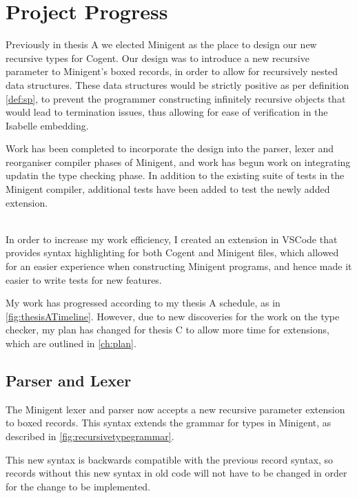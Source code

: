 \chapter{Project Progress}\label{ch:progress}

Previously in thesis A we elected Minigent as the place to design our new recursive types for Cogent.
Our design was to introduce a new recursive parameter to Minigent's boxed records, in order to allow
for recursively nested data structures. These data structures would be strictly positive as per
definition \autoref{def:sp}, to prevent the programmer constructing infinitely recursive
objects that would lead to termination issues, thus allowing for ease of verification in
the Isabelle embedding.

Work has been completed to incorporate the design into the parser, lexer and reorganiser compiler phases of
Minigent, and work has begun work on integrating updatin the type checking phase.
In addition to the existing suite of tests in the Minigent compiler, additional tests have 
been added to test the newly added extension.

 \\
In order to increase my work efficiency, I created an extension in VSCode that provides syntax highlighting
for both Cogent and Minigent files, which allowed for an easier experience when constructing Minigent programs,
and hence made it easier to write tests for new features.

My work has progressed according to my thesis A schedule, as in \autoref{fig:thesisATimeline}. However, due to 
new discoveries  for the work on the type checker, my plan has changed for 
thesis C to allow more time for extensions, which are outlined in \autoref{ch:plan}.

\section{Parser and Lexer}

The Minigent lexer and parser now accepts a new recursive parameter extension to boxed records. 
This syntax extends the grammar for types in Minigent, as described in \autoref{fig:recursivetypegrammar}.

This new syntax is backwards compatible with the previous record syntax, so records without this new
syntax in old code will not have to be changed in order for the change to be implemented.


